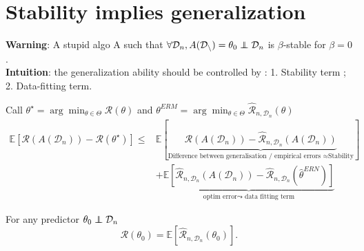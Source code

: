 \section{Stability implies generalization}


\textbf{Warning}: A stupid algo A such that $ \forall \mathcal{D}_n, A(\mathcal{D_n}) = \theta _0 \perp\!\!\!\!\perp \mathcal{D}_n $ is $ \beta $-stable for $ \beta = 0 $. \\

\textbf{Intuition}: the generalization ability should be controlled by : 1. Stability term ; 2. Data-fitting term. \\

\begin{lem}[]
    Call $ \theta ^\star  = \arg \min_{\theta  \in  \Theta } \mathcal{R}(\theta )$  and $\theta ^{ERM} = \arg \min_{\theta  \in  \Theta} \hat{\mathcal{R}}_{n, \mathcal{D}_n}(\theta )$
\begin{align*}
    \mathbb{E}[ \mathcal{R} (A (\mathcal{D}_n )) - \mathcal{R} (\theta ^\star )] \leq &\mathbb{E}[ \underbrace{\mathcal{R} (A (\mathcal{D}_n )) - \hat{\mathcal{R}} _{n, \mathcal{D}_n} (A (\mathcal{D}_n ))}_{\text{Difference between generalisation / empirical errors } \approx \text{Stability}}     ] \\
    & + \underbrace{\mathbb{E}[ \hat{\mathcal{R}}_{n, \mathcal{D}_n} (A (\mathcal{D}_n)) - \hat{\mathcal{R}}_{n ,\mathcal{D}_n} ( \hat{\theta }^{ERN })]}_{\text{optim error} \leadsto \text{ data fitting term}}
\end{align*}
\end{lem}

\begin{note}[]
    For any predictor $\theta _0 \perp\!\!\!\!\perp \mathcal{D}_n $ 
    \[
        \mathcal{R}(\theta _0) = \mathbb{E}[\hat{\mathcal{R}}_{n, \mathcal{D}_n}(\theta_0 )]
    .\]
    
\end{note}

